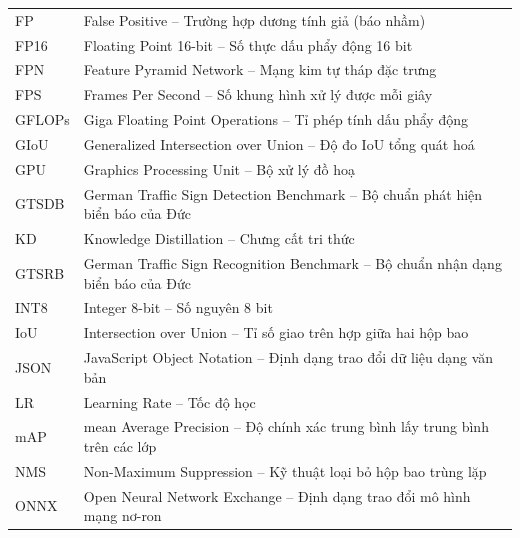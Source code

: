 \begin{longtable}{>{\centering\arraybackslash}p{3.2cm} p{10.5cm}}
    FP & False Positive -- Trường hợp dương tính giả (báo nhầm) \\

    FP16 & Floating Point 16-bit -- Số thực dấu phẩy động 16 bit \\

    FPN & Feature Pyramid Network -- Mạng kim tự tháp đặc trưng \\

    FPS & Frames Per Second -- Số khung hình xử lý được mỗi giây \\

    GFLOPs & Giga Floating Point Operations -- Tỉ phép tính dấu phẩy động \\

    GIoU & Generalized Intersection over Union -- Độ đo IoU tổng quát hoá \\

    GPU & Graphics Processing Unit -- Bộ xử lý đồ hoạ \\

    GTSDB & German Traffic Sign Detection Benchmark -- Bộ chuẩn phát hiện biển báo của Đức \\

    KD & Knowledge Distillation -- Chưng cất tri thức \\

    GTSRB & German Traffic Sign Recognition Benchmark -- Bộ chuẩn nhận dạng biển báo của Đức \\

    INT8 & Integer 8-bit -- Số nguyên 8 bit \\

    IoU & Intersection over Union -- Tỉ số giao trên hợp giữa hai hộp bao \\

    JSON & JavaScript Object Notation -- Định dạng trao đổi dữ liệu dạng văn bản \\

    LR & Learning Rate -- Tốc độ học \\

    mAP & mean Average Precision -- Độ chính xác trung bình lấy trung bình trên các lớp \\

    NMS & Non-Maximum Suppression -- Kỹ thuật loại bỏ hộp bao trùng lặp \\

    ONNX & Open Neural Network Exchange -- Định dạng trao đổi mô hình mạng nơ-ron \\


\end{longtable}
